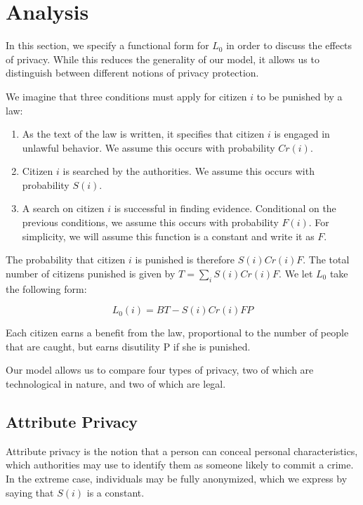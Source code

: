 
\section{Analysis}
\label{sec:analysis}

In this section, we specify a functional form for $L_0$ in order to discuss the effects of privacy.  While this reduces the generality of our model, it allows us to distinguish between different notions of privacy protection.  

We imagine that three conditions must apply for citizen $i$ to be punished by a law:

\begin{enumerate}
\item As the text of the law is written, it specifies that citizen $i$ is engaged in unlawful behavior.  We assume this occurs with probability $Cr(i)$.
\item Citizen $i$ is searched by the authorities.  We assume this occurs with probability $S(i)$.
\item A search on citizen $i$ is successful in finding evidence.  Conditional on the previous conditions, we assume this occurs with probability $F(i)$.  For simplicity, we will assume this function is a constant and write it as $F$.
\end{enumerate}

The probability that citizen $i$ is punished is therefore $S(i)Cr(i)F$.  The total number of citizens punished is given by $T = \sum_i S(i)Cr(i)F$.  We let $L_0$ take the following form:

$$L_0(i) = BT - S(i)Cr(i)FP$$

Each citizen earns a benefit from the law, proportional to the number of people that are caught, but earns disutility P if she is punished.

Our model allows us to compare four types of privacy, two of which are technological in nature, and two of which are legal.

\subsection{Attribute Privacy}

Attribute privacy is the notion that a person can conceal personal characteristics, which authorities may use to identify them as someone likely to commit a crime.  In the extreme case, individuals may be fully anonymized, which we express by saying that $S(i)$ is a constant. 

